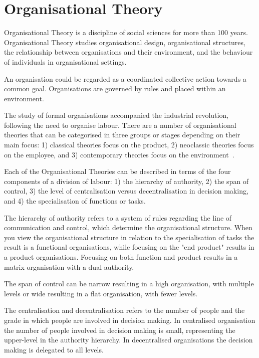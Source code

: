 \documentclass[a4paper,12pt,oneside,fleqn]{book} %
\begin{document}
\section{Organisational Theory}  %

Organisational Theory is a discipline of social sciences for more than 100
years. Organisational Theory studies organisational design, organisational
structures, the relationship between organisations and their environment, and
the behaviour of individuals in organisational settings.

An organisation could be regarded as a coordinated collective action
towards a common goal. Organisations are governed by rules and placed
within an environment.

The study of formal organisations accompanied the industrial
revolution, following the need to organise labour. There are a number of
organisational theories that can be categorised in three groups or stages
depending on their main focus: 1) classical theories focus on the product,
2) neoclassic theories focus on the employee, and 3) contemporary theories focus
on the environment~\cite{DohertySD01}.

Each of the Organisational Theories can be described in terms of the four
components of a division of labour: 1) the hierarchy of authority, 2) the
span of control, 3) the level of centralisation versus decentralisation in
decision making, and 4) the specialisation of functions or tasks.

The hierarchy of authority refers to a system of rules regarding the line
of communication and control, which determine the organisational structure.
When you view the organisational structure in relation to the
specialisation of tasks the result is a functional organisations, while
focusing on the "end product" results in a product organisations. Focusing
on both function and product results in a matrix organisation with a dual
authority.

The span of control can be narrow resulting in a high organisation, with
multiple levels or wide resulting in a flat organisation, with fewer levels.

The centralisation and decentralisation refers to the number of people and
the grade in which people are involved in decision making. In centralised
organisation the number of people involved in decision making is small,
representing the upper-level in the authority hierarchy. In decentralised
organisations the decision making is delegated to all levels.
\end{document}
